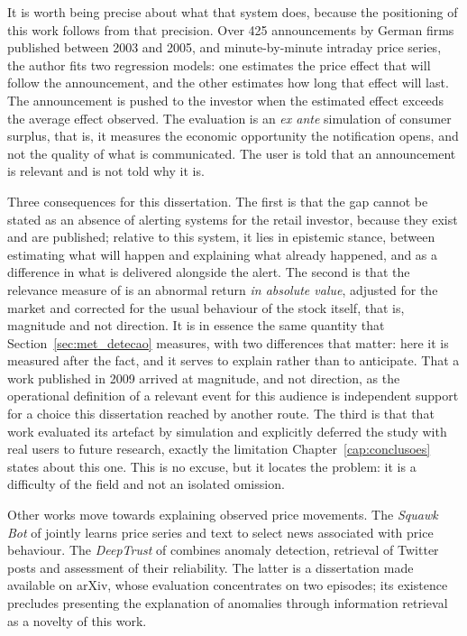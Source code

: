 It is worth being precise about what that system does, because the positioning of this work follows
from that precision. Over 425 announcements by German firms published between 2003 and 2005, and
minute-by-minute intraday price series, the author fits two regression models: one estimates the
price effect that will follow the announcement, and the other estimates how long that effect will
last. The announcement is pushed to the investor when the estimated effect exceeds the average
effect observed. The evaluation is an \emph{ex ante} simulation of consumer surplus, that is, it
measures the economic opportunity the notification opens, and not the quality of what is
communicated. The user is told that an announcement is relevant and is not told why it is.

Three consequences for this dissertation. The first is that the gap cannot be stated as an absence
of alerting systems for the retail investor, because they exist and are published; relative to this
system, it lies in epistemic stance, between estimating what will happen and explaining what
already happened, and as a difference in what is delivered alongside the alert. The second is that
the relevance measure of \textcite{muntermann2009ubiquitous} is an abnormal return \emph{in
absolute value}, adjusted for the market and corrected for the usual behaviour of the stock itself,
that is, magnitude and not direction. It is in essence the same quantity that
Section~\ref{sec:met_detecao} measures, with two differences that matter: here it is measured after
the fact, and it serves to explain rather than to anticipate. That a work published in 2009 arrived
at magnitude, and not direction, as the operational definition of a relevant event for this
audience is independent support for a choice this dissertation reached by another route. The third
is that that work evaluated its artefact by simulation and explicitly deferred the study with real
users to future research, exactly the limitation Chapter~\ref{cap:conclusoes} states about this
one. This is no excuse, but it locates the problem: it is a difficulty of the field and not an
isolated omission.

Other works move towards explaining observed price movements. The \emph{Squawk Bot} of
\textcite{dang2020squawk} jointly learns price series and text to select news associated with
price behaviour. The \emph{DeepTrust} of \textcite{chan2022deeptrust} combines anomaly detection,
retrieval of Twitter posts and assessment of their reliability. The latter is a dissertation
made available on arXiv, whose evaluation concentrates on two episodes; its existence precludes
presenting the explanation of anomalies through information retrieval as a novelty of this work.

